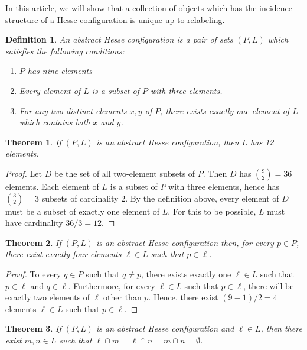 \documentclass[12pt]{article}
\newtheorem{def}{Definition}
\newtheorem{thm}{Theorem}
\begin{document}
In this article, we will show that a collection 
of objects which has the incidence structure of
a Hesse configuration is unique up to relabeling.

\begin{def}
An \emph{abstract Hesse configuration} is a pair of
sets $(P,L)$ which satisfies the following conditions:
\begin{enumerate}
\item $P$ has nine elements
\item Every element of $L$ is a subset of $P$ with three elements.
\item For any two distinct elements $x,y$ of $P$, there
exists exactly one element of $L$ which contains both $x$ and $y$.
\end{enumerate}
\end{def}

\begin{thm}
If $(P,L)$ is an abstract Hesse configuration,
then $L$ has 12 elements.
\end{thm}

\begin{proof}
Let $D$ be the set of all two-element subsets of $P$.
Then $D$ has ${9 \choose 2} = 36$ elements.  Each
element of $L$ is a subset of $P$ with three elements,
hence has ${3 \choose 2} = 3$ subsets of cardinality 2.
By the definition above, every element of $D$ must
be a subset of exactly one element of $L$.  For this
to be possible, $L$ must have cardinality $36/3 = 12$.
\end{proof}

\begin{thm}
If $(P,L)$ is an abstract Hesse configuration then, for
every $p \in P$, there exist exactly four elements
$\ell \in L$ such that $p \in \ell$.
\end{thm}

\begin{proof}
To every $q \in P$ such that $q \neq p$, there exists
exactly one $\ell \in L$ such that $p \in \ell$ and 
$q \in \ell$.  Furthermore, for every $\ell \in L$ such
that $p \in \ell$, there will be exactly two elements
of $\ell$ other than $p$.  Hence, there exist $(9-1)/2 = 4$
elements $\ell \in L$ such that $p \in \ell$.
\end{proof}

\begin{thm}
If $(P,L)$ is an abstract Hesse configuration and $\ell \in L$,
then there exist $m,n \in L$ such that $\ell \cap m =
\ell \cap n = m \cap n = \emptyset$.
\end{thm}
\end{document}
